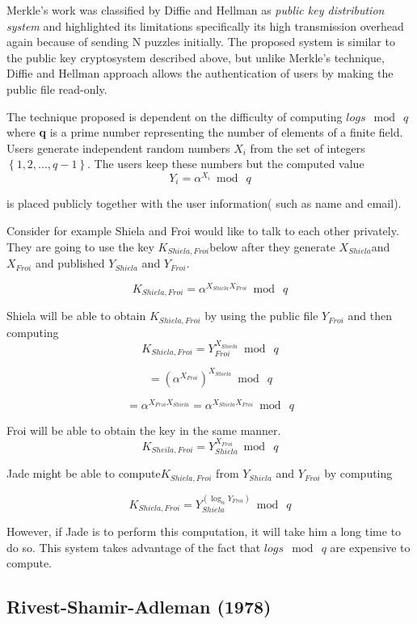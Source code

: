 \documentclass{article}
\begin{document}
Merkle's\cite{merkle_secure_1978} work was classified by Diffie and
Hellman as \textit{public key distribution system} and highlighted
its limitations specifically its high transmission overhead again
because of sending N puzzles initially. The proposed system is similar
to the public key cryptosystem described above, but unlike Merkle's
technique, Diffie and Hellman approach allows the authentication of
users by making the public file read-only\cite{diffie_new_1976}. 

The technique proposed is dependent on the difficulty of computing
$logs\: \bmod\: q$ where \textbf{q} is a prime number representing
the number of elements of a finite field. Users generate independent
random numbers $X_{i}$ from the set of integers $\left\{ 1,2,...,q-1\right\} $.
The users keep these numbers but the computed value 
\[
Y_{i}=\alpha^{X_{i}}\bmod\: q
\]


is placed publicly together with the user information( such as name
and email). 

Consider for example Shiela and Froi would like to talk to each other
privately. They are going to use the key $K_{Shiela,Froi}$below after
they generate $X_{Shiela}$and $X_{Froi}$ and published $Y_{Shiela}$
and $Y_{Froi}$.

\[
K_{Shiela,Froi}=\alpha^{X_{Shiela}X_{Froi}}\bmod\: q
\]


Shiela will be able to obtain $K_{Shiela,Froi}$ by using the public
file $Y_{Froi}$ and then computing
\[
K_{Shiela,Froi}=Y_{Froi}^{X_{Shiela}}\bmod\: q
\]
 
\[
=(\alpha^{X_{Froi}})^{X_{Shiela}}\bmod\: q
\]


\[
=\alpha^{X_{Froi}X_{Shiela}}=\alpha^{X_{Shiela}X_{Froi}}\bmod\: q
\]


Froi will be able to obtain the key in the same manner. 
\[
K_{Sheila,Froi}=Y_{Shiela}^{X_{Froi}}\bmod\: q
\]
 

Jade might be able to compute$K_{Shiela,Froi}$ from $Y_{Shiela}$
and $Y_{Froi}$ by computing

\[
K_{Shiela,Froi}=Y_{Shiela}^{(\log_{\alpha}Y_{Froi})}\bmod\: q
\]


However, if Jade is to perform this computation, it will take him
a long time to do so. This system takes advantage of the fact that
$logs\: \bmod\: q$ are expensive to compute.


\subsection{Rivest-Shamir-Adleman (1978)}
\end{document}
